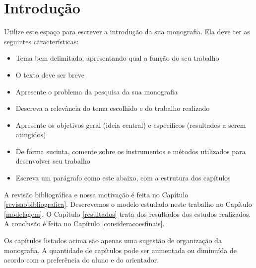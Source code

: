 \chapter{Introdução}\label{introducao}

Utilize este espaço para escrever a introdução da sua monografia. Ela deve ter as seguintes características:

\begin{itemize}

  \item Tema bem delimitado, apresentando qual a função do seu trabalho
  \item O texto deve ser breve
  \item Apresente o problema da pesquisa da sua monografia
  \item Descreva a relevância do tema escolhido e do trabalho realizado
  \item Apresente os objetivos geral (ideia central) e específicos (resultados a serem atingidos)
  \item De forma sucinta, comente sobre os instrumentos e métodos utilizados para desenvolver seu trabalho
  \item Escreva um parágrafo como este abaixo, com a estrutura dos capítulos

\end{itemize}

A revisão bibliográfica e nossa motivação é feita no Capítulo \ref{revisaobibliografica}. Descrevemos o modelo estudado neste trabalho no Capítulo \ref{modelagem}. O Capítulo \ref{resultados} trata dos resultados dos estudos realizados. A conclusão é feita no Capítulo \ref{consideracoesfinais}.

Os capítulos listados acima são apenas uma sugestão de organização da monografia. A quantidade de capítulos pode ser aumentada ou diminuída de acordo com a preferência do aluno e do orientador.


